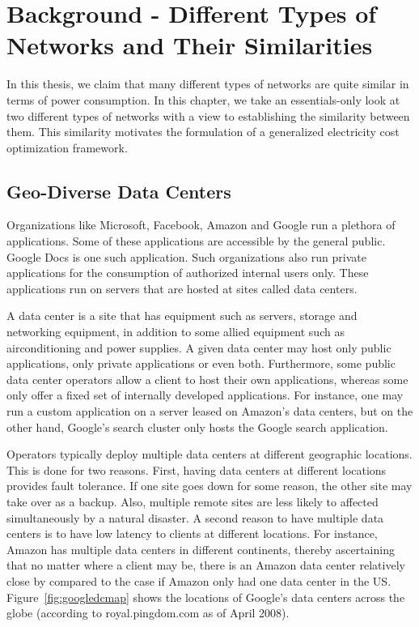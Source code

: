 \chapter{Background - Different Types of Networks and Their Similarities }
\label{chap:background}
In this thesis, we claim that many different types of networks are quite similar in terms of power consumption. In this chapter, we take an essentials-only look at two different types of networks with a view to establishing the similarity between them. This similarity motivates the formulation of a generalized electricity cost optimization framework. 

\section{Geo-Diverse Data Centers} Organizations like Microsoft, Facebook, Amazon and Google run a plethora of applications. Some of these applications are accessible by the general public. Google Docs is one such application. Such organizations also run private applications for the consumption of authorized internal users only. These applications run on servers that are hosted at sites called data centers.

A data center is a site that has equipment such as servers, storage and networking equipment, in addition to some allied equipment such as airconditioning and power supplies. A given data center may host only public applications, only private applications or even both. Furthermore, some public data center operators allow a client to host their own applications, whereas some only offer a fixed set of internally developed applications. For instance, one may run a custom application on a server leased on Amazon's data centers, but on the other hand, Google's search cluster only hosts the Google search application. 

Operators typically deploy multiple data centers at different geographic locations. This is done for two reasons. First, having data centers at different locations provides fault tolerance. If one site goes down for some reason, the other site may take over as a backup. Also, multiple remote sites are less likely to affected simultaneously by a natural disaster. A second reason to have multiple data centers is to have low latency to clients at different locations. For instance, Amazon has multiple data centers in different continents, thereby ascertaining that no matter where a client may be, there is an Amazon data center relatively close by compared to the case if Amazon only had one data center in the US. Figure~\ref{fig:googledcmap} shows the locations of Google's data centers across the globe (according to royal.pingdom.com as of April 2008).

